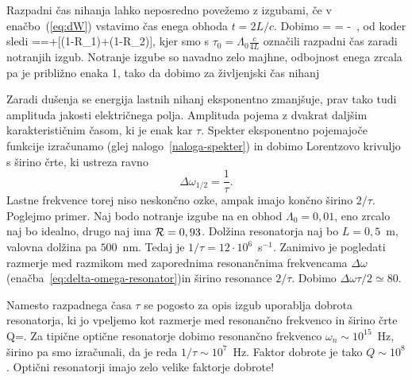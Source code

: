 \noindent
Razpadni čas nihanja lahko neposredno povežemo z izgubami, če v enačbo~(\ref{eq:dW})
vstavimo čas enega obhoda $t=2L/c$. Dobimo
\beq
{}= \Lambda = -\, ,
\eeq
od koder sledi
\beq
{}==+[(1-{\cal R}_{1})+(1-{\cal R}_{2})],
\label{taulambda}
\eeq
kjer smo s $\tau_{0}=\Lambda_{0}\frac{c}{4L}$ označili razpadni
čas zaradi notranjih izgub. Notranje izgube so navadno zelo majhne, odbojnost enega zrcala
pa je približno enaka 1, tako da dobimo za življenjski čas nihanj 

\noindent
Zaradi dušenja se energija lastnih nihanj eksponentno zmanjšuje, prav tako tudi
amplituda jakosti električnega polja. Amplituda pojema z dvakrat daljšim 
karakterističnim časom, ki je enak kar $\tau$. Spekter eksponentno pojemajoče funkcije izračunamo
(glej nalogo~\ref{naloga-spekter}) in dobimo Lorentzovo krivuljo s širino črte, ki ustreza ravno
\begin{equation}
\Delta\omega_{1/2}=\frac{1}{\tau}.
\label{3.26}
\end{equation}
Lastne frekvence torej niso neskončno ozke, ampak imajo končno širino $2/\tau$.
Poglejmo primer. Naj bodo notranje izgube na en obhod $\Lambda_0=0,01$,
eno zrcalo naj bo idealno, drugo naj ima ${\cal R}=0,93$. Dolžina
resonatorja naj bo $L=0,5$~m, valovna dolžina pa $500$~nm. Tedaj
je $1/\tau=12\cdot10^{6}$~s$^{-1}$. Zanimivo je pogledati razmerje med 
razmikom med zaporednima resonančnima frekvencama $\Delta \omega$ 
(enačba~\ref{eq:delta-omega-resonator})in širino resonance $2/\tau$. 
Dobimo $\Delta\omega\tau/2 \simeq 80$.\\

\begin{remark}
Namesto razpadnega časa $\tau$ se pogosto za opis izgub uporablja
dobrota resonatorja, ki jo vpeljemo kot
razmerje med resonančno frekvenco in širino črte 
\beq
Q=.
\eeq
Za tipične optične resonatorje dobimo resonančno 
frekvenco $\omega_n \sim 10^{15}$~Hz, širino pa smo izračunali, da je reda 
 $1/\tau \sim 10^{7}$~Hz. Faktor dobrote je tako $Q \sim 10^{8}$. Optični 
 resonatorji imajo zelo velike faktorje dobrote!
\end{remark}

